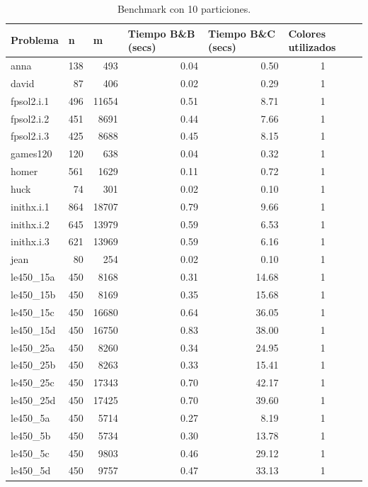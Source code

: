 \begin{table}[H]
\centering
\caption{Benchmark con 10 particiones.}
\begin{tabular}{|l|r|r|r|r|c|}
\hline
Problema & \multicolumn{1}{l|}{n} & \multicolumn{1}{l|}{m} & \multicolumn{1}{l|}{Tiempo B\&B (secs)} & \multicolumn{1}{l|}{Tiempo B\&C (secs)} & \multicolumn{1}{l|}{Colores utilizados} \\ \hline
anna & 138 & 493 & 0.04 & 0.50 & 1 \\ \hline
david & 87 & 406 & 0.02 & 0.29 & 1 \\ \hline
fpsol2.i.1 & 496 & 11654 & 0.51 & 8.71 & 1 \\ \hline
fpsol2.i.2 & 451 & 8691 & 0.44 & 7.66 & 1 \\ \hline
fpsol2.i.3 & 425 & 8688 & 0.45 & 8.15 & 1 \\ \hline
games120 & 120 & 638 & 0.04 & 0.32 & 1 \\ \hline
homer & 561 & 1629 & 0.11 & 0.72 & 1 \\ \hline
huck & 74 & 301 & 0.02 & 0.10 & 1 \\ \hline
inithx.i.1 & 864 & 18707 & 0.79 & 9.66 & 1 \\ \hline
inithx.i.2 & 645 & 13979 & 0.59 & 6.53 & 1 \\ \hline
inithx.i.3 & 621 & 13969 & 0.59 & 6.16 & 1 \\ \hline
jean & 80 & 254 & 0.02 & 0.10 & 1 \\ \hline
le450\_15a & 450 & 8168 & 0.31 & 14.68 & 1 \\ \hline
le450\_15b & 450 & 8169 & 0.35 & 15.68 & 1 \\ \hline
le450\_15c & 450 & 16680 & 0.64 & 36.05 & 1 \\ \hline
le450\_15d & 450 & 16750 & 0.83 & 38.00 & 1 \\ \hline
le450\_25a & 450 & 8260 & 0.34 & 24.95 & 1 \\ \hline
le450\_25b & 450 & 8263 & 0.33 & 15.41 & 1 \\ \hline
le450\_25c & 450 & 17343 & 0.70 & 42.17 & 1 \\ \hline
le450\_25d & 450 & 17425 & 0.70 & 39.60 & 1 \\ \hline
le450\_5a & 450 & 5714 & 0.27 & 8.19 & 1 \\ \hline
le450\_5b & 450 & 5734 & 0.30 & 13.78 & 1 \\ \hline
le450\_5c & 450 & 9803 & 0.46 & 29.12 & 1 \\ \hline
le450\_5d & 450 & 9757 & 0.47 & 33.13 & 1 \\ \hline

\end{tabular}
\end{table}
